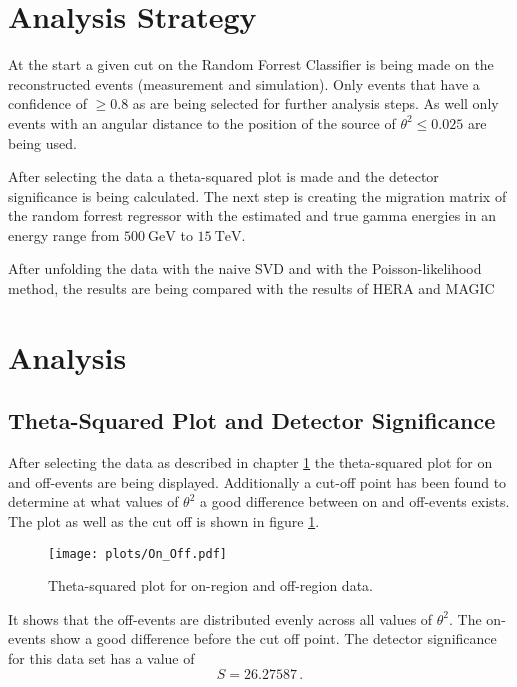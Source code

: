 \section{Analysis Strategy}
\label{sec:Analysis-Strategy}

At the start a given cut on the Random Forrest Classifier is being made on the reconstructed events (measurement and simulation).
Only events that have a confidence of $\geq 0.8$ as are being selected for further analysis steps.
As well only events with an angular distance to the position of the source of $\theta^2 \leq \num{0.025}$ are being used.

After selecting the data a theta-squared plot is made and the detector significance is being calculated.
The next step is creating the migration matrix of the random forrest regressor with the estimated and true gamma energies in an
energy range from $\SI{500}{\giga\electronvolt}$ to $\SI{15}{\tera\electronvolt}$.

After unfolding the data with the naive SVD and with the Poisson-likelihood method, the results are being compared with the results of HERA and MAGIC

\section{Analysis}

\subsection{Theta-Squared Plot and Detector Significance}
After selecting the data as described in chapter \ref{sec:Analysis-Strategy} the theta-squared plot for on and off-events are being displayed.
Additionally a cut-off point has been found to determine at what values of $\theta^2$ a good difference between on and off-events exists.
The plot as well as the cut off is shown in figure \ref{fig:tsquared}.

\begin{figure}[H]
  \centering
  \texttt{[image: plots/On\_Off.pdf]}
  \caption{Theta-squared plot for on-region and off-region data.}
  \label{fig:tsquared}
\end{figure}

It shows that the off-events are distributed evenly across all values of $\theta^2$.
The on-events show a good difference before the cut off point.
The detector significance for this data set has a value of
\begin{equation}
  S = 26.27587\,.
\end{equation}

